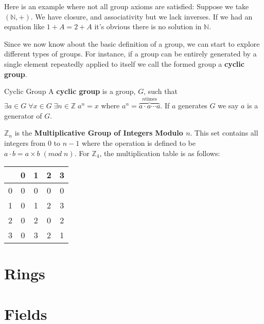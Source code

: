 \begin{ex}
  Here is an example where not all group axioms are satisfied:
  Suppose we take $(\mathbb{N}, +)$.
  We have closure, and associativity but we lack inverses.
  If we had an equation like $1+A=2+A$ it's obvious there is no solution in $\mathbb{N}$.
\end{ex}

Since we now know about the basic definition of a group, we can start to explore different types of groups.
For instance, if a group can be entirely generated by a single element repeatedly applied to itself we call the formed group a \textbf{cyclic group}.

\begin{defn}{Cyclic Group}
  A \textbf{cyclic group} is a group, $G$, such that $\exists a \in G \; \forall x \in G \; \exists n \in \mathbb{Z} \; a^n = x$ where $a^n = \overbrace{a \cdot a \cdots a}^{n\text{times}}$.
  If $a$ generates $G$ we say $a$ is a generator of $G$.
\end{defn}

\begin{ex}
  $\mathbb{Z}_n$ is the \textbf{Multiplicative Group of Integers Modulo $n$}.
  This set contains all integers from $0$ to $n-1$ where the operation is defined to be $a \cdot b = a \times b \; (mod \; n)$.
  For $\mathbb{Z}_4$, the multiplication table is as follows:

  \begin{center}
  \begin{tabular}{c|cccc}
      & 0 & 1 & 2 & 3 \\
    \toprule
    0 & 0 & 0 & 0 & 0 \\
    1 & 0 & 1 & 2 & 3 \\
    2 & 0 & 2 & 0 & 2 \\
    3 & 0 & 3 & 2 & 1
  \end{tabular}
  \end{center}

\end{ex}



\section{Rings}

\section{Fields}

